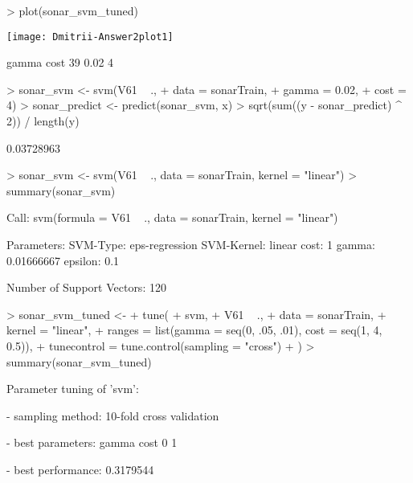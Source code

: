 \documentclass{article}
\begin{document}
\begin{Schunk}
\begin{Sinput}
> plot(sonar_svm_tuned)
\end{Sinput}
\end{Schunk}
\texttt{[image: Dmitrii-Answer2plot1]}
\begin{Schunk}
\begin{Soutput}
   gamma cost
39  0.02    4
\end{Soutput}
\begin{Sinput}
> sonar_svm <- svm(V61 ~ .,
+                  data = sonarTrain,
+                  gamma = 0.02,
+                  cost = 4)
> sonar_predict <- predict(sonar_svm, x)
> sqrt(sum((y - sonar_predict) ^ 2)) / length(y)
\end{Sinput}
\begin{Soutput}
[1] 0.03728963
\end{Soutput}
\begin{Sinput}
> sonar_svm <- svm(V61 ~ ., data = sonarTrain, kernel = "linear")
> summary(sonar_svm)
\end{Sinput}
\begin{Soutput}
Call:
svm(formula = V61 ~ ., data = sonarTrain, kernel = "linear")


Parameters:
   SVM-Type:  eps-regression 
 SVM-Kernel:  linear 
       cost:  1 
      gamma:  0.01666667 
    epsilon:  0.1 


Number of Support Vectors:  120
\end{Soutput}
\begin{Sinput}
> sonar_svm_tuned <-
+   tune(
+     svm,
+     V61 ~ .,
+     data = sonarTrain,
+     kernel = "linear",
+     ranges = list(gamma = seq(0, .05, .01), cost = seq(1, 4, 0.5)),
+     tunecontrol = tune.control(sampling = "cross")
+   )
> summary(sonar_svm_tuned)
\end{Sinput}
\begin{Soutput}
Parameter tuning of 'svm':

- sampling method: 10-fold cross validation 

- best parameters:
 gamma cost
     0    1

- best performance: 0.3179544 


\end{Soutput}
\end{Schunk}
\end{document}
